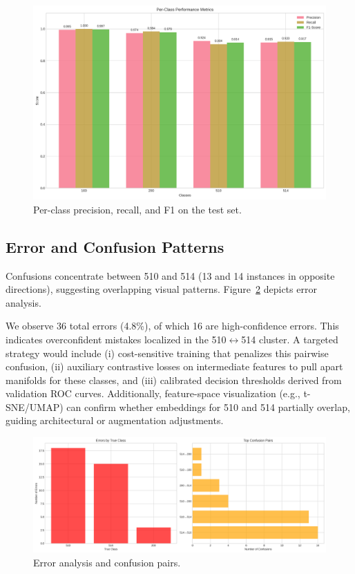 \documentclass[11pt,a4paper]{article}
\begin{document}
\begin{figure}[H]
  \centering
  \includegraphics[width=.85\linewidth]{images/per_class_metrics.png}
  \caption{Per-class precision, recall, and F1 on the test set.}
  \label{fig:perclass}
\end{figure}

\subsection{Error and Confusion Patterns}
Confusions concentrate between 510 and 514 (13 and 14 instances in opposite directions), suggesting overlapping visual patterns. Figure~\ref{fig:errors} depicts error analysis.

We observe 36 total errors (4.8\%), of which 16 are high-confidence errors. This indicates overconfident mistakes localized in the 510\(\leftrightarrow\)514 cluster. A targeted strategy would include (i) cost-sensitive training that penalizes this pairwise confusion, (ii) auxiliary contrastive losses on intermediate features to pull apart manifolds for these classes, and (iii) calibrated decision thresholds derived from validation ROC curves. Additionally, feature-space visualization (e.g., t-SNE/UMAP) can confirm whether embeddings for 510 and 514 partially overlap, guiding architectural or augmentation adjustments.

\begin{figure}[H]
  \centering
  \includegraphics[width=.85\linewidth]{images/error_analysis.png}
  \caption{Error analysis and confusion pairs.}
  \label{fig:errors}
\end{figure}
\end{document}
